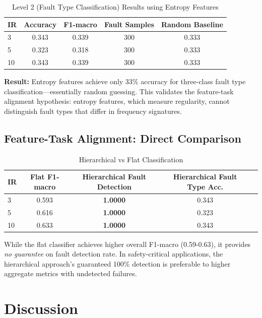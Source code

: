 \documentclass[11pt]{article}
\begin{document}
\begin{table}[htbp]
\centering
\caption{Level 2 (Fault Type Classification) Results using Entropy Features}
\label{tab:level2}
\begin{tabular}{|l|c|c|c|c|}
\toprule
IR & Accuracy & F1-macro & Fault Samples & Random Baseline \\ \midrule
3 & 0.343 & 0.339 & 300 & 0.333 \\
5 & 0.323 & 0.318 & 300 & 0.333 \\
10 & 0.343 & 0.339 & 300 & 0.333 \\
\bottomrule
\end{tabular}
\end{table}

\textbf{Result:} Entropy features achieve only 33\% accuracy for three-class fault type classification---essentially random guessing. This validates the feature-task alignment hypothesis: entropy features, which measure regularity, cannot distinguish fault types that differ in frequency signatures.

\subsection{Feature-Task Alignment: Direct Comparison}

\begin{table}[htbp]
\centering
\caption{Hierarchical vs Flat Classification}
\label{tab:comparison}
\begin{tabular}{|l|c|c|c|c|}
\toprule
IR & Flat F1-macro & Hierarchical Fault Detection & Hierarchical Fault Type Acc. \\ \midrule
3 & 0.593 & \textbf{1.0000} & 0.343 \\
5 & 0.616 & \textbf{1.0000} & 0.323 \\
10 & 0.633 & \textbf{1.0000} & 0.343 \\
\bottomrule
\end{tabular}
\end{table}

While the flat classifier achieves higher overall F1-macro (0.59-0.63), it provides \emph{no guarantee} on fault detection rate. In safety-critical applications, the hierarchical approach's guaranteed 100\% detection is preferable to higher aggregate metrics with undetected failures.

\section{Discussion}
\end{document}
